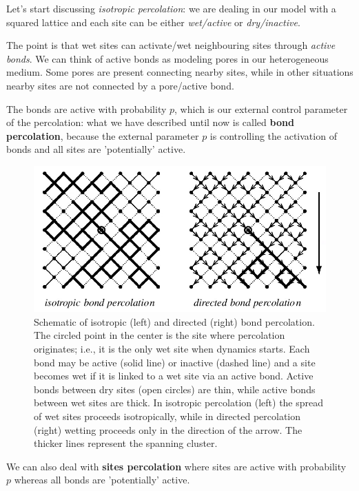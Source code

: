 \documentclass[\main/main.tex]{subfiles}
\begin{document}
Let's start discussing \textit{isotropic percolation}: we are dealing in our model with a squared lattice and each site can be either \textit{wet/active} or \textit{dry/inactive}. 

The point is that wet sites can activate/wet neighbouring sites through \textit{active bonds}. We can think of active bonds as modeling pores in our heterogeneous medium. Some pores are present connecting nearby sites, while in other situations nearby sites are not connected by a pore/active bond.

The bonds are active with probability $p$, which is our external control parameter of the percolation: what we have described until now is called \textbf{bond percolation}, because the external parameter $p$ is controlling the activation of bonds and all sites are 'potentially' active. \\

\begin{figure}[ht]
    \centering
    \includegraphics[width=0.87\linewidth]{Lectures/Images/percol.jpg}
    \caption{Schematic of isotropic (left) and directed (right) bond percolation. The circled point in the center is the site where
percolation originates; i.e., it is the only wet site when dynamics starts. Each bond may be active (solid line) or inactive (dashed line) and a site becomes wet if it is linked to a wet site via an active bond. Active bonds between dry sites (open circles) are thin, while active bonds between wet sites are thick. In isotropic percolation (left) the spread of wet sites proceeds isotropically, while in directed percolation (right) wetting proceeds only in the direction of the arrow. The thicker lines represent the spanning cluster.}
    \label{fig:percolation}
\end{figure}
We can also deal with \textbf{sites percolation} where sites are active with probability $p$ whereas all bonds are 'potentially' active. \\
\end{document}

